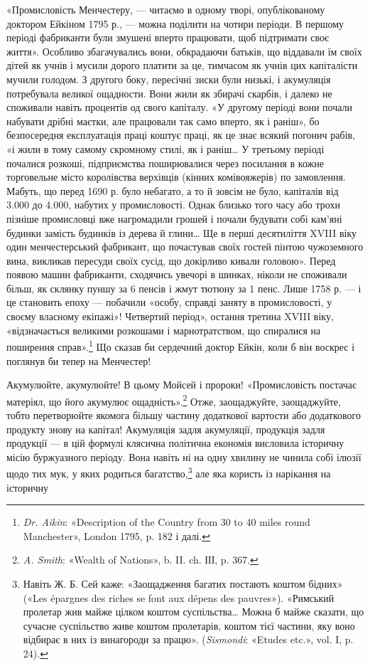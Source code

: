 «Промисловість Менчестеру, — читаємо в одному творі, опублікованому
доктором Ейкіном 1795 р., — можна поділити на
чотири періоди. В першому періоді фабриканти були змушені
вперто працювати, щоб підтримати своє життя». Особливо збагачувались
вони, обкрадаючи батьків, що віддавали їм своїх дітей
як учнів і мусили дорого платити за це, тимчасом як учнів цих
капіталісти мучили голодом. З другого боку, пересічні зиски
були низькі, і акумуляція потребувала великої ощадности.
Вони жили як збирачі скарбів, і далеко не споживали навіть
процентів од свого капіталу. «У другому періоді вони почали
набувати дрібні маєтки, але працювали так само вперто, як і
раніш», бо безпосередня експлуатація праці коштує праці, як
це знає всякий погонич рабів, «і жили в тому самому скромному
стилі, як і раніш\dots{} У третьому періоді почалися розкоші, підприємства
поширювалися через посилання в кожне торговельне
місто королівства верхівців (кінних комівояжерів) по замовлення.
Мабуть, що перед 1690 р. було небагато, а то й зовсім не було,
капіталів від 3.000 до 4.000, набутих у промисловості.
Однак близько того часу або трохи пізніше промисловці
вже нагромадили грошей і почали будувати собі кам’яні
будинки замість будинків із дерева й глини\dots{} Ще в перші десятиліття
XVIII віку один менчестерський фабрикант, що почастував
своїх гостей пінтою чужоземного вина, викликав пересуди
своїх сусід, що докірливо кивали головою». Перед появою машин
фабриканти, сходячись увечорі в шинках, ніколи не споживали
більш, як склянку пуншу за 6 пенсів і жмут тютюну за 1 пенс.
Лише 1758 р. — і це становить епоху — побачили «особу, справді
заняту в промисловості, у своєму власному екіпажі»! Четвертий
період», остання третина XVIII віку, «відзначається великими
розкошами і марнотратством, що спиралися на поширення
справ».\footnote{
\emph{Dr. Aikin}: «Description of the Country from 30 to 40 miles round
Manchester», London 1795, p. 182 і далі.
} Що сказав би сердечний доктор Ейкін, коли б він
воскрес і поглянув би тепер на Менчестер!

Акумулюйте, акумулюйте! В цьому Мойсей і пророки! «Промисловість
постачає матеріял, що його акумулює ощадність».\footnote{
\emph{A. Smith}: «Wealth of Nations», b. II. ch. ІІІ, p. 367.
}
Отже, заощаджуйте, заощаджуйте, тобто перетворюйте якомога
більшу частину додаткової вартости або додаткового продукту
знову на капітал! Акумуляція задля акумуляції, продукція
задля продукції — в цій формулі клясична політична економія
висловила історичну місію буржуазного періоду. Вона навіть ні
на одну хвилину не чинила собі ілюзії щодо тих мук, у яких родиться
багатство,\footnote{
Навіть Ж. Б. Сей каже: «Заощадження багатих постають коштом
бідних» («Les épargnes des riches se font aux dépens des pauvres»). «Римський
пролетар жив майже цілком коштом суспільства\dots{} Можна б майже
сказати, що сучасне суспільство живе коштом пролетарів, коштом тієї
частини, яку воно відбирає в них із винагороди за працю». (\emph{Sismondi}:
«Etudes etc.», vol. I, p. 24).
} але яка користь із нарікання на історичну
\parbreak{}  %
